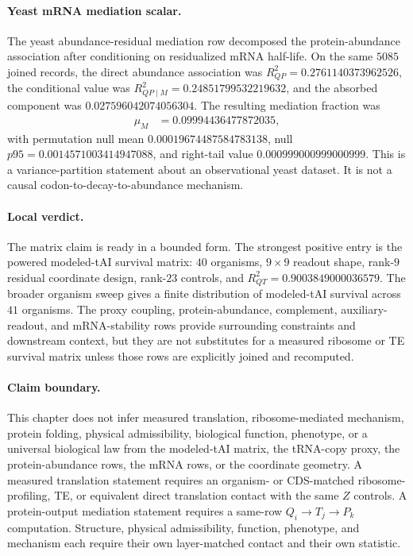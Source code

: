 \paragraph{Yeast mRNA mediation scalar.}
The yeast abundance-residual mediation row decomposed the protein-abundance association after conditioning on residualized mRNA half-life.  On the same $5085$ joined records, the direct abundance association was $R^2_{QP}=0.2761140373962526$, the conditional value was $R^2_{QP\mid M}=0.24851799532219632$, and the absorbed component was $0.027596042074056304$.  The resulting mediation fraction was
$$
\begin{aligned}
\mu_M &= 0.09994436477872035,
\end{aligned}
$$
with permutation null mean $0.00019674487584783138$, null $p95=0.0014571003414947088$, and right-tail value $0.000999000999000999$.  This is a variance-partition statement about an observational yeast dataset.  It is not a causal codon-to-decay-to-abundance mechanism.

\paragraph{Local verdict.}
The matrix claim is ready in a bounded form.  The strongest positive entry is the powered modeled-tAI survival matrix: $40$ organisms, $9\times 9$ readout shape, rank-$9$ residual coordinate design, rank-$23$ controls, and $R^2_{QT}=0.9003849000036579$.  The broader organism sweep gives a finite distribution of modeled-tAI survival across $41$ organisms.  The proxy coupling, protein-abundance, complement, auxiliary-readout, and mRNA-stability rows provide surrounding constraints and downstream context, but they are not substitutes for a measured ribosome or TE survival matrix unless those rows are explicitly joined and recomputed.

\paragraph{Claim boundary.}
This chapter does not infer measured translation, ribosome-mediated mechanism, protein folding, physical admissibility, biological function, phenotype, or a universal biological law from the modeled-tAI matrix, the tRNA-copy proxy, the protein-abundance rows, the mRNA rows, or the coordinate geometry.  A measured translation statement requires an organism- or CDS-matched ribosome-profiling, TE, or equivalent direct translation contact with the same $Z$ controls.  A protein-output mediation statement requires a same-row $Q_i\to T_j\to P_k$ computation.  Structure, physical admissibility, function, phenotype, and mechanism each require their own layer-matched contact and their own statistic.

